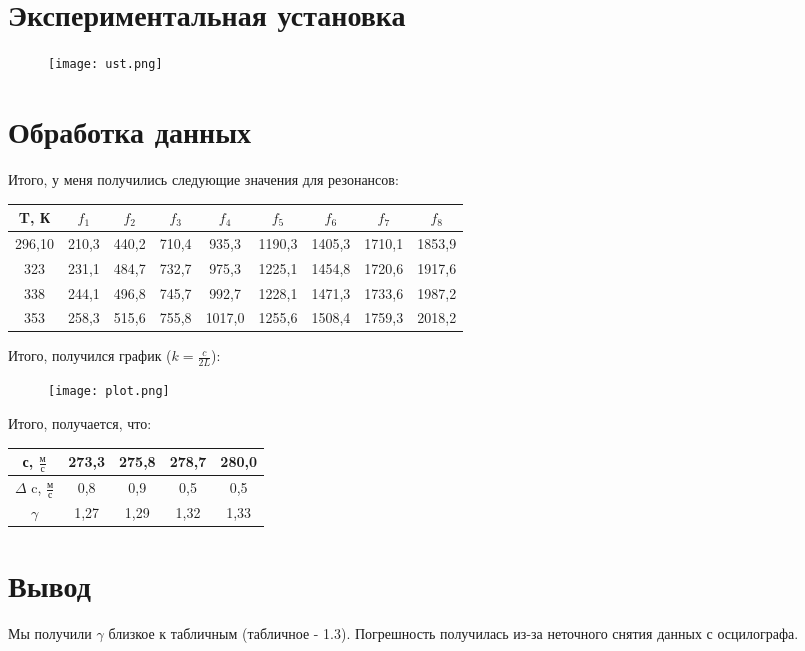 \documentclass[a4paper, 12pt]{article}
\begin{document}
\section{Экспериментальная установка}

\begin{figure}[h]
  \texttt{[image: ust.png]}
\end{figure}

\newpage
\section{Обработка данных}
Итого, у меня получились следующие значения для резонансов:
\begin{table}[h]
  \begin{center}
  \begin{tabular}{|c|c|c|c|c|c|c|c|c|}
    \hline
    T, К & $f_1$ & $f_2$ & $f_3$ & $f_4$ & $f_5$ & $f_6$ & $f_7$ & $f_8$ \\
    \hline
    296,10 & 210,3 & 440,2 & 710,4 & 935,3  & 1190,3 & 1405,3 & 1710,1 & 1853,9 \\
    323    & 231,1 & 484,7 & 732,7 & 975,3  & 1225,1 & 1454,8 & 1720,6 & 1917,6 \\
    338    & 244,1 & 496,8 & 745,7 & 992,7  & 1228,1 & 1471,3 & 1733,6 & 1987,2 \\
    353    & 258,3 & 515,6 & 755,8 & 1017,0 & 1255,6 & 1508,4 & 1759,3 & 2018,2 \\
    \hline
  \end{tabular}
  \end{center}
\end{table}

Итого, получился график ($k = \frac{c}{2L}$):
\begin{figure}[h]
  \texttt{[image: plot.png]}
\end{figure}

Итого, получается, что:
\begin{table}[h]
  \begin{center}
  \begin{tabular}{|c|c|c|c|c|}
    \hline
    с, $\frac{м}{с}$ & 273,3 & 275,8 & 278,7 & 280,0 \\
    \hline
    $\Delta$ c, $\frac{м}{с}$  & 0,8 & 0,9 & 0,5 & 0,5  \\
    \hline
    $\gamma$ & 1,27 & 1,29 & 1,32 & 1,33 \\
    \hline
  \end{tabular}
  \end{center}
\end{table}

\section{Вывод}
Мы получили $\gamma$ близкое к табличным (табличное - 1.3). Погрешность получилась из-за неточного снятия данных с осцилографа.
\end{document}

